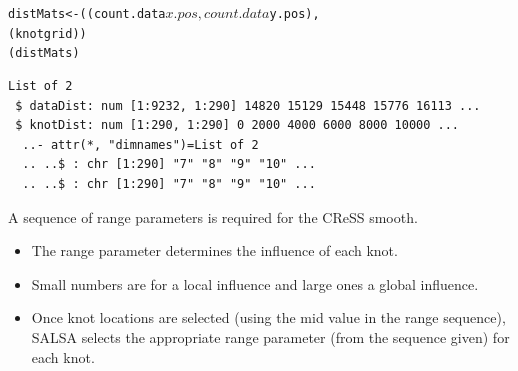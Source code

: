 \begin{frame}[fragile]
\begin{knitrout}\footnotesize
{}\color{fgcolor}\begin{kframe}
\begin{alltt}
distMats <- ((count.data$x.pos, count.data$y.pos), 
               (knotgrid))
(distMats)
\end{alltt}
\begin{verbatim}
List of 2
 $ dataDist: num [1:9232, 1:290] 14820 15129 15448 15776 16113 ...
 $ knotDist: num [1:290, 1:290] 0 2000 4000 6000 8000 10000 ...
  ..- attr(*, "dimnames")=List of 2
  .. ..$ : chr [1:290] "7" "8" "9" "10" ...
  .. ..$ : chr [1:290] "7" "8" "9" "10" ...
\end{verbatim}
\end{kframe}
\end{knitrout}

\noindent A sequence of range parameters is required for the CReSS smooth.  
\begin{itemize}
\item The range parameter determines the influence of each knot.  
\item Small numbers are for a local influence and large ones a global influence.
\item Once knot locations are selected (using the mid value in the range sequence), SALSA selects the appropriate range parameter (from the sequence given) for each knot.
\end{itemize}
\begin{knitrout}\footnotesize
{}\color{fgcolor}
\end{knitrout}
\end{frame}



